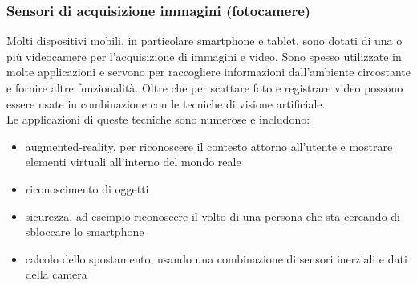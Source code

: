 \subsubsection{Sensori di acquisizione immagini (fotocamere)}
Molti dispositivi mobili, in particolare smartphone e tablet, sono dotati di una o più videocamere per l’acquisizione di immagini e video.
Sono spesso utilizzate in molte applicazioni e servono per raccogliere informazioni dall'ambiente circostante e fornire altre funzionalità. Oltre che per scattare foto e registrare video possono essere usate in combinazione con le tecniche di visione artificiale. \\    Le applicazioni di queste tecniche sono numerose e includono: 
\begin{itemize}
    \item augmented-reality, per riconoscere il contesto attorno all'utente e mostrare elementi virtuali all'interno del mondo reale
    \item riconoscimento di oggetti
    \item sicurezza, ad esempio riconoscere il volto di una persona che sta cercando di sbloccare lo smartphone
    \item calcolo dello spostamento, usando una combinazione di sensori inerziali e dati della camera
\end{itemize}

